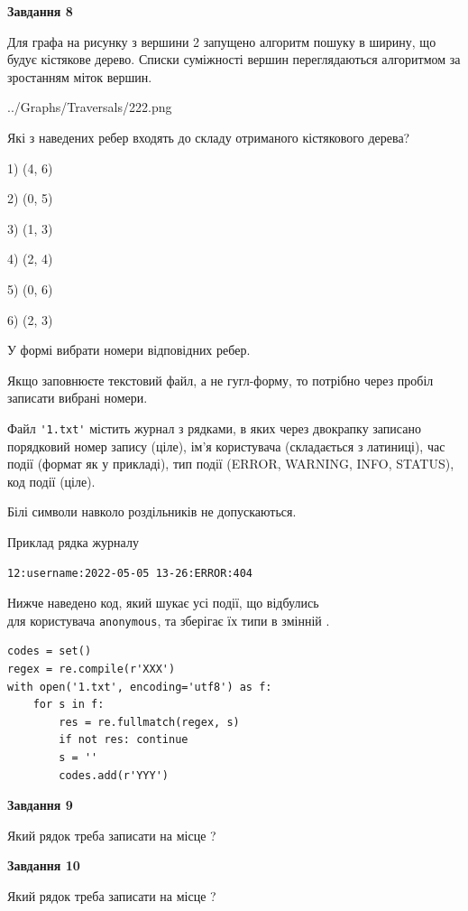 \documentclass[12pt, ukrainian]{article}
\def\code#1{\Verb!#1!}
\begin{document}
{\begin {large}
{\begin {center}\textbf{Завдання 8}\end {center}}\par
Для графа на рисунку з вершини 2 запущено алгоритм пошуку в ширину, що будує кістякове дерево. Списки суміжності вершин переглядаються алгоритмом за зростанням міток вершин.\par
\begin{center}
	{../Graphs/Traversals/222.png}
\end{center}
\par Які з наведених ребер входять до складу отриманого кістякового дерева?\par
1) (4, 6)\par
2) (0, 5)\par
3) (1, 3)\par
4) (2, 4)\par
5) (0, 6)\par
6) (2, 3)\par
{\vskip 15pt} У формі вибрати номери відповідних ребер.


Якщо заповнюєте текстовий файл, а не гугл-форму, то потрібно через пробіл записа\-ти вибрані номери.\par
\newpage


Файл \code{'1.txt'} містить журнал з рядками, в яких через двокрапку записано поряд\-ко\-вий номер запису (ціле), ім'я користувача (складається з латиниці), час події (фор\-мат як у прикладі), тип події (ERROR, WARNING, INFO, STATUS), код події (ціле).

Білі символи навколо роздільників не допускаються.

Приклад рядка журналу



\begin{verbatim}
12:username:2022-05-05 13-26:ERROR:404
\end{verbatim}


Нижче наведено код, який шукає усі події, що відбулись\\ для користувача \code{anonymous}, та зберігає їх типи в змінній .



\begin{verbatim}
codes = set()
regex = re.compile(r'XXX')
with open('1.txt', encoding='utf8') as f:
    for s in f:
        res = re.fullmatch(regex, s)
        if not res: continue
        s = ''
        codes.add(r'YYY')
\end{verbatim}


{\begin {center}\textbf{Завдання 9}\end {center}}\par
Який рядок треба записати на місце  ?\par
\vspace{5mm}


{\begin {center}\textbf{Завдання 10}\end {center}}\par
Який рядок треба записати на місце  ?\par


\newpage


\end {large}}
\end{document}
